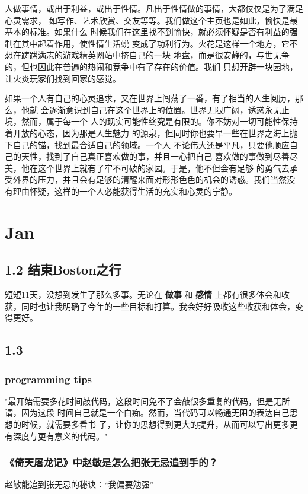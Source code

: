 \documentclass[11pt]{article}
\begin{document}
人做事情，或出于利益，或出于性情。凡出于性情做的事情，大都仅仅是为了满足心灵需求，
如写作、艺术欣赏、交友等等。我们做这个主页也是如此，愉快是最基本的标准。如果什么
时候我们在这里找不到愉快，就必须怀疑是否有利益的强制在其中起着作用，使性情生活蜕
变成了功利行为。火花是这样一个地方，它不想在踌躇满志的游戏精英网站中挤自己的一块
地盘，而是很安静的，与世无争的，但也因此在普遍的热闹和竞争中有了存在的价值。我们
只想开辟一块园地，让火炎玩家们找到回家的感觉。

如果一个人有自己的心灵追求，又在世界上闯荡了一番，有了相当的人生阅历，那么，他就
会逐渐意识到自己在这个世界上的位置。世界无限广阔，诱惑永无止境，然而，属于每一个
人的现实可能性终究是有限的。你不妨对一切可能性保持着开放的心态，因为那是人生魅力
的源泉，但同时你也要早一些在世界之海上抛下自己的锚，找到最合适自己的领域。一个人
不论伟大还是平凡，只要他顺应自己的天性，找到了自己真正喜欢做的事，并且一心把自己
喜欢做的事做到尽善尽美，他在这个世界上就有了牢不可破的家园。于是，他不但会有足够
的勇气去承受外界的压力，并且会有足够的清醒来面对形形色色的机会的诱惑。我们当然没
有理由怀疑，这样的一个人必能获得生活的充实和心灵的宁静。
\section*{Jan}
\label{sec:orgheadline69}
\subsection*{1.2 结束Boston之行}
\label{sec:orgheadline3}
短短11天，没想到发生了那么多事。无论在 \textbf{做事} 和 \textbf{感情} 上都有很多体会和收获，同时也让我明确了今年的一些目标和打算。我会好好吸收这些收获和体会，变得更好。
\subsection*{1.3}
\label{sec:orgheadline6}
\subsubsection*{programming tips}
\label{sec:orgheadline4}
"最开始需要多花时间敲代码，这段时间免不了会敲很多重复的代码，但是无所谓，因为这段
时间自己就是一个白痴。然而，当代码可以畅通无阻的表达自己思想的时候，就需要多看书
了，让你的思想得到更大的提升，从而可以写出更多更有深度与更有意义的代码。"
\subsubsection*{《倚天屠龙记》中赵敏是怎么把张无忌追到手的？}
\label{sec:orgheadline5}
赵敏能追到张无忌的秘诀：“我偏要勉强”
\end{document}
